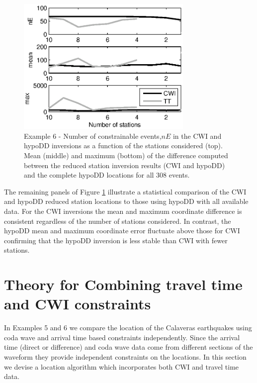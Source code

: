 \documentclass[extra, onecolumn, doublespacing]{gji}
\begin{document}
\begin{figure}
\noindent\includegraphics[width =
20pc]{diags/CalaverasLoc4_hypoDD_SVD.eps} \caption{Example 6 -
Number of constrainable events,$nE$ in
the CWI and hypoDD inversions as a function of the stations
considered (top). Mean (middle) and maximum (bottom) of the difference
computed between the reduced station inversion results (CWI and
hypoDD) and the complete hypoDD locations for all 308 events. } \label{fig-statremoval_summarystats}
\end{figure}

The remaining panels of Figure \ref{fig-statremoval_summarystats}
illustrate a statistical comparison of the CWI and hypoDD reduced
station locations to those using hypoDD with all available data. For
the CWI inversions the mean and maximum coordinate difference is
consistent regardless of the number of stations considered. In
contrast, the hypoDD mean and maximum coordinate error fluctuate
above those for CWI confirming that the hypoDD inversion is less
stable than CWI with fewer stations.

\section{Theory for Combining travel time and CWI constraints}
\label{sec:CalaverasLoc-CWIandTT}
In Examples 5 and 6 we compare the location of the Calaveras
earthquakes using coda wave and arrival time based constraints
independently. Since the arrival time (direct or difference) and
coda wave data
 come from different sections of the waveform they provide independent constraints on the locations.
 In this section we devise a location algorithm which incorporates
 both CWI and travel time data.
\end{document}
